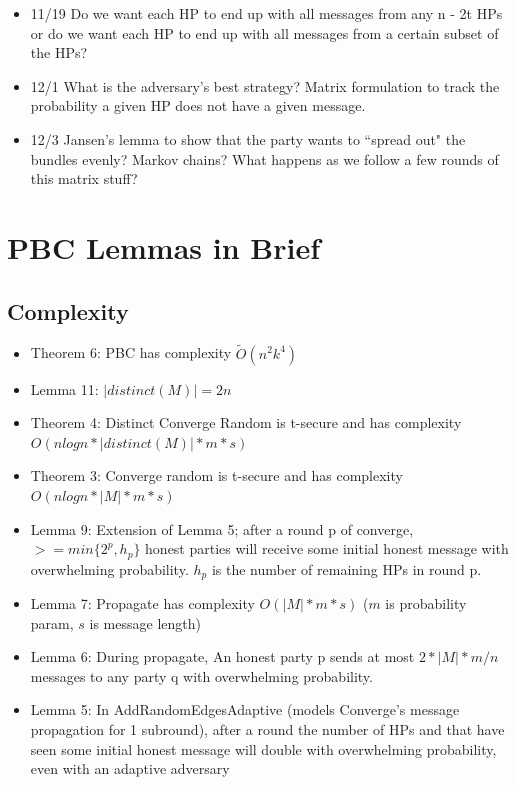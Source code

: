 \documentclass{article}
\begin{document}
\begin{itemize}
 \item 11/19 Do we want each HP to end up with all messages from any n - 2t HPs or do we want each HP to end up with all messages from a certain subset of the HPs?
 \item 12/1 What is the adversary's best strategy? Matrix formulation to track the probability a given HP does not have a given message.
 \item 12/3 Jansen's lemma to show that the party wants to ``spread out" the bundles evenly? Markov chains? What happens as we follow a few rounds of this matrix stuff?
\end{itemize}

\section{PBC Lemmas in Brief}
\subsection{Complexity}
\begin{itemize}
\item Theorem 6: PBC has complexity $\tilde O(n^2k^4)$
\item Lemma 11: $|distinct(M)| = 2n$
\item Theorem 4: Distinct Converge Random is t-secure and has complexity $O(nlogn * |distinct(M)| * m * s)$
\item Theorem 3: Converge random is t-secure and has complexity $O(nlogn * |M| * m * s)$
\item Lemma 9: Extension of Lemma 5; after a round p of converge, $>= min\{2^p, h_p\}$ honest parties will receive some initial honest message with overwhelming probability. $h_p$ is the number of remaining HPs in round p.
\item Lemma 7: Propagate has complexity $O(|M| * m * s)$ ($m$ is probability param, $s$ is message length)
\item Lemma 6: During propagate, An honest party p sends at most $2 * |M| * m/n$ messages to any party q with overwhelming probability. 
\item Lemma 5: In AddRandomEdgesAdaptive (models Converge's message propagation for 1 subround), after a round the number of HPs and that have seen some initial honest message will double with overwhelming probability, even with an adaptive adversary
\end{itemize}
\end{document}
